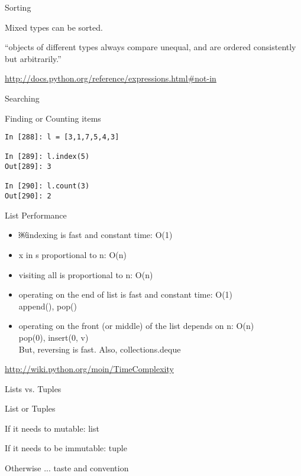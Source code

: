 \documentclass{beamer}
\begin{document}
\begin{frame}[fragile]{Sorting}

{\Large
Mixed types can be sorted.
}
\vfill
{\center \Large

``objects of different types always compare unequal, and are ordered
consistently but arbitrarily.''

}

\vfill
\url{http://docs.python.org/reference/expressions.html#not-in}
\end{frame} 

\begin{frame}[fragile]{Searching}

{\Large Finding or Counting items}

\begin{verbatim}
In [288]: l = [3,1,7,5,4,3]

In [289]: l.index(5)
Out[289]: 3

In [290]: l.count(3)
Out[290]: 2
\end{verbatim}

\end{frame} 


\begin{frame}[fragile]{List Performance }

\begin{itemize}
  \item￼indexing is fast and constant time: O(1)
  \item x in s proportional to n: O(n)
  \item visiting all is proportional to n: O(n)
  \item operating on the end of list is fast and constant time: O(1) \\
     append(), pop()
  \item operating on the front (or middle) of the list depends on n: O(n)\\
     pop(0), insert(0, v) \\
     But, reversing is fast. Also, collections.deque
\end{itemize}

\url{ http://wiki.python.org/moin/TimeComplexity}

\end{frame} 


\begin{frame}[fragile]{Lists vs. Tuples}

\vfill
{\Large List or Tuples}

\vfill
{\Large
If it needs to mutable: list

\vfill
If it needs to be immutable: tuple\\
}
\hspace{0.2in}{\large (dict key, safety when passing to a function) }

\vfill
{\Large Otherwise ... taste and convention}

\end{frame} 
\end{document}
